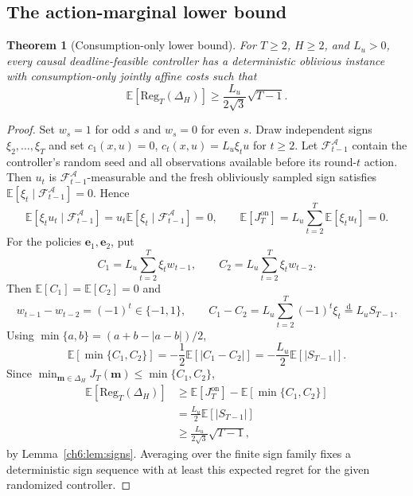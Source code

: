 \documentclass[11pt]{article}
\newcommand{\E}{\mathbb{E}}
\newcommand{\Reg}{\mathrm{Reg}}
\theoremstyle{plain}
\newtheorem{Thm:Theorem}{Theorem}[section]
\theoremstyle{remark}
\numberwithin{equation}{section}
\begin{document}
\subsection{The action-marginal lower bound}
\begin{Thm:Theorem}[Consumption-only lower bound]\label{ch6:thm:lower-action}
For $T\ge2$, $H\ge2$, and $L_u>0$, every causal deadline-feasible controller
has a deterministic oblivious instance with consumption-only jointly affine
costs such that
\begin{equation}\label{ch6:eq:lower-action}
 \E[\Reg_T(\Delta_H)]\ge\frac{L_u}{2\sqrt3}\sqrt{T-1}.
\end{equation}
\end{Thm:Theorem}
\begin{proof}
Set $w_s=1$ for odd $s$ and $w_s=0$ for even $s$. Draw independent signs
$\xi_2,\ldots,\xi_T$ and set
$c_1(x,u)=0$, $c_t(x,u)=L_u\xi_tu$ for $t\ge2$.
Let $\mathcal F_{t-1}^{\mathcal A}$ contain the controller's random seed
and all observations available before its round-$t$ action.  Then
$u_t$ is $\mathcal F_{t-1}^{\mathcal A}$-measurable and the fresh
obliviously sampled sign satisfies
$\E[\xi_t\mid\mathcal F_{t-1}^{\mathcal A}]=0$.  Hence
\[
\E[\xi_tu_t\mid\mathcal F_{t-1}^{\mathcal A}]
=u_t\E[\xi_t\mid\mathcal F_{t-1}^{\mathcal A}]=0,
\qquad
\E[J_T^{\mathrm{on}}]=L_u\sum_{t=2}^{T}\E[\xi_tu_t]=0.
\]
For the policies $\mathbf e_1,\mathbf e_2$, put
\[
C_1=L_u\sum_{t=2}^{T}\xi_tw_{t-1},
\qquad
C_2=L_u\sum_{t=2}^{T}\xi_tw_{t-2}.
\]
Then $\E[C_1]=\E[C_2]=0$ and
\[
w_{t-1}-w_{t-2}=(-1)^t\in\{-1,1\},
\qquad
C_1-C_2=L_u\sum_{t=2}^{T}(-1)^t\xi_t
\stackrel{\mathrm{d}}{=}L_uS_{T-1}.
\]
Using $\min\{a,b\}=(a+b-|a-b|)/2$,
\[
\E[\min\{C_1,C_2\}]
=-\frac12\E[|C_1-C_2|]
=-\frac{L_u}{2}\E[|S_{T-1}|].
\]
Since $\min_{\mathbf m\in\Delta_H}J_T(\mathbf m)\le\min\{C_1,C_2\}$,
\begin{align*}
\E[\Reg_T(\Delta_H)]
&\ge \E[J_T^{\mathrm{on}}]-\E[\min\{C_1,C_2\}]\\
&=\frac{L_u}{2}\E[|S_{T-1}|]\\
&\ge\frac{L_u}{2\sqrt3}\sqrt{T-1},
\end{align*}
by Lemma~\ref{ch6:lem:signs}.  Averaging over the finite sign family fixes
a deterministic sign sequence with at least this expected regret for the
given randomized controller.
\end{proof}
\end{document}

